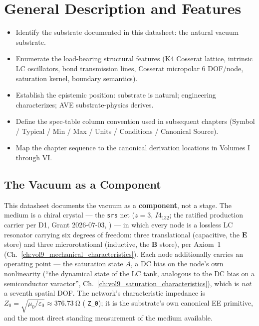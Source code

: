 \chapter{General Description and Features}
\label{ch:vol9_general_description}

\begin{objectivebox}
\begin{itemize}
    \item Identify the substrate documented in this datasheet: the natural vacuum substrate.
    \item Enumerate the load-bearing structural features (K4 Cosserat lattice, intrinsic LC oscillators, bond transmission lines, Cosserat micropolar 6 DOF/node, saturation kernel, boundary semantics).
    \item Establish the epistemic position: substrate is natural; engineering characterizes; AVE substrate-physics derives.
    \item Define the spec-table column convention used in subsequent chapters (Symbol / Typical / Min / Max / Units / Conditions / Canonical Source).
    \item Map the chapter sequence to the canonical derivation locations in Volumes I through VI.
\end{itemize}
\end{objectivebox}

\section{The Vacuum as a Component}
\label{sec:vol9_vacuum_as_component}

This datasheet documents the vacuum as a \textbf{component}, not a stage. The medium is a chiral crystal --- the \texttt{srs} net ($z=3$, $I4_132$; the ratified production carrier per D1, Grant 2026-07-03, ) --- in which every node is a lossless LC resonator carrying six degrees of freedom: three translational (capacitive, the $\mathbf{E}$ store) and three microrotational (inductive, the $\mathbf{B}$ store), per Axiom~1 (Ch.~\ref{ch:vol9_mechanical_characteristics}). Each node additionally carries an operating point --- the saturation state $A$, a DC bias on the node's own nonlinearity (``the dynamical state of the LC tank, analogous to the DC bias on a semiconductor varactor'', Ch.~\ref{ch:vol9_saturation_characteristics}), which is \emph{not} a seventh spatial DOF. The network's characteristic impedance is $Z_0 = \sqrt{\mu_0/\varepsilon_0} \approx \qty{376.73}{\ohm}$ ( \texttt{Z\_0}); it is the substrate's own canonical EE primitive, and the most direct standing measurement of the medium available.

